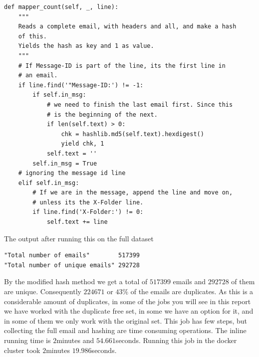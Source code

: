 \documentclass[runningheads,a4paper]{llncs}
\begin{document}
\begin{verbatim}
def mapper_count(self, _, line):
    """
    Reads a complete email, with headers and all, and make a hash
    of this.
    Yields the hash as key and 1 as value.
    """
    # If Message-ID is part of the line, its the first line in
    # an email.
    if line.find('"Message-ID:') != -1:
        if self.in_msg:
            # we need to finish the last email first. Since this
            # is the beginning of the next.
            if len(self.text) > 0:
                chk = hashlib.md5(self.text).hexdigest()
                yield chk, 1
            self.text = ''
        self.in_msg = True
    # ignoring the message id line
    elif self.in_msg:
        # If we are in the message, append the line and move on,
        # unless its the X-Folder line.
        if line.find('X-Folder:') != 0:
            self.text += line
\end{verbatim}
The output after running this on the full dataset
\begin{verbatim}
"Total number of emails"        517399
"Total number of unique emails" 292728 
\end{verbatim}
By the modified hash method we get a total of $517399$ emails and $292728$ of them are unique. Consequently $224671$ or $43\%$ of the emails are duplicates. As this is a considerable amount of duplicates, in some of the jobs you will see in this report we have worked with the duplicate free set, in some we have an option for it, and in some of them we only work with the original set.
\newline
This job has few steps, but collecting the full email and hashing are time consuming operations. The inline running time is $2$minutes and $54.661$seconds. Running this job in the docker cluster took $2$minutes $19.986$seconds.
\newline
\end{document}
